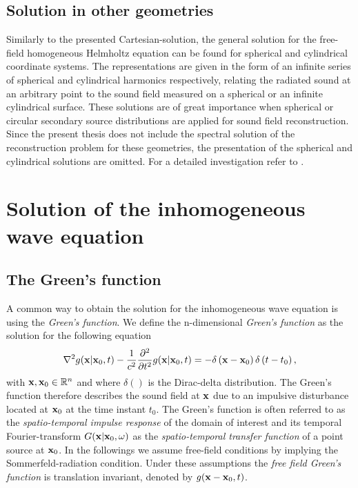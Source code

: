 %
\subsection{Solution in other geometries}
Similarly to the presented Cartesian-solution, the general solution for the free-field homogeneous Helmholtz equation can be found for spherical and cylindrical coordinate systems. 
The representations are given in the form of an infinite series of spherical and cylindrical harmonics respectively, relating the radiated sound at an arbitrary point to the sound field measured on a spherical or an infinite cylindrical surface.
These solutions are of great importance when spherical or circular secondary source distributions are applied for sound field reconstruction. 
Since the present thesis does not include the spectral solution of the reconstruction problem for these geometries, the presentation of the spherical and cylindrical solutions are omitted. 
For a detailed investigation refer to \cite{Williams1999, Zotter2009phd, Ahrens2012}.

%
%
%
%
%
%
%
%
%
%
%
%
\newpage
\section{Solution of the inhomogeneous wave equation}

\subsection{The Green's function}
A common way to obtain the solution for the inhomogeneous wave equation is using the \emph{Green's function}. 
We define the n-dimensional \emph{Green's function} as the solution for the following equation \cite{Gumerov2004, Williams1999}
\begin{equation}
\nabla^2 g(\mathbf{x}|\mathbf{x}_0,t) -\frac{1}{c^2}\frac{\partial^2}{\partial t^2} g(\mathbf{x}|\mathbf{x}_0,t) = -\delta\left( \mathbf{x} - \mathbf{x}_0 \right)\delta\left( t - t_0 \right),
\label{Eq:Theory:Green_function_def}
\end{equation}
with $\mathbf{x}, \mathbf{x}_0 \in \mathbb{R}^{n}$ and where $\delta()$ is the Dirac-delta distribution. 
The Green's function therefore describes the sound field at $\mathbf{x}$ due to an impulsive disturbance located at $\mathbf{x}_0$ at the time instant $t_0$.
The Green's function is often referred to as the \emph{spatio-temporal impulse response} of the domain of interest and its temporal Fourier-transform $G(\mathbf{x}|\mathbf{x}_0,\omega)$ as the \emph{spatio-temporal transfer function} of a point source at $\mathbf{x}_0$. 
In the followings we assume free-field conditions by implying the Sommerfeld-radiation condition. 
Under these assumptions the \emph{free field Green's function} is translation invariant, denoted by $g(\mathbf{x}-\mathbf{x}_0,t)$.

